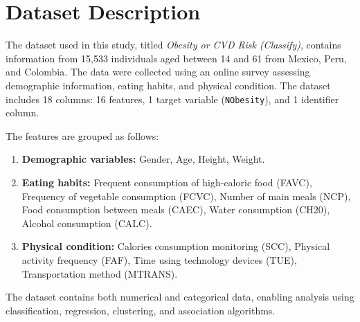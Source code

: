 \chapter{Dataset Description}\label{ch:dataset-description}


The dataset used in this study, titled \textit{Obesity or CVD Risk (Classify)}, contains information from 15,533 individuals aged between 14 and 61 from Mexico, Peru, and Colombia.
The data were collected using an online survey assessing demographic information, eating habits, and physical condition.
The dataset includes 18 columns: 16 features, 1 target variable (\texttt{NObesity}), and 1 identifier column.

The features are grouped as follows:

\begin{enumerate}
    \item \textbf{Demographic variables:} Gender, Age, Height, Weight.
    \item \textbf{Eating habits:} Frequent consumption of high-caloric food (FAVC), Frequency of vegetable consumption (FCVC), Number of main meals (NCP), Food consumption between meals (CAEC), Water consumption (CH20), Alcohol consumption (CALC).
    \item \textbf{Physical condition:} Calories consumption monitoring (SCC), Physical activity frequency (FAF), Time using technology devices (TUE), Transportation method (MTRANS).
\end{enumerate}

The dataset contains both numerical and categorical data, enabling analysis using classification, regression, clustering, and association algorithms.





